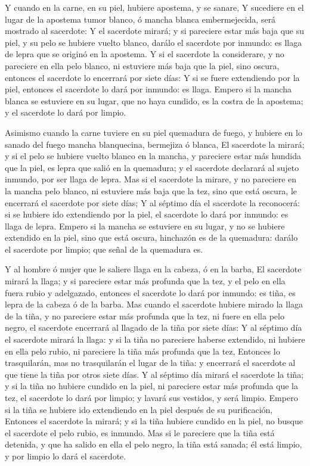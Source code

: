  Y cuando en la carne, en su piel, hubiere apostema, y se
sanare,  Y sucediere en el lugar de la apostema tumor
blanco, ó mancha blanca embermejecida, será mostrado al sacerdote:
 Y el sacerdote mirará; y si pareciere estar más baja que
su piel, y su pelo se hubiere vuelto blanco, darálo el sacerdote por
inmundo: es llaga de lepra que se originó en la apostema. 
Y si el sacerdote la considerare, y no pareciere en ella pelo blanco, ni
estuviere más baja que la piel, sino oscura, entonces el sacerdote lo
encerrará por siete días:  Y si se fuere extendiendo por la
piel, entonces el sacerdote lo dará por inmundo: es llaga. 
Empero si la mancha blanca se estuviere en su lugar, que no haya
cundido, es la costra de la apostema; y el sacerdote lo dará por limpio.

 Asimismo cuando la carne tuviere en su piel quemadura de
fuego, y hubiere en lo sanado del fuego mancha blanquecina, bermejiza ó
blanca,  El sacerdote la mirará; y si el pelo se hubiere
vuelto blanco en la mancha, y pareciere estar más hundida que la piel,
es lepra que salió en la quemadura; y el sacerdote declarará al sujeto
inmundo, por ser llaga de lepra.  Mas si el sacerdote la
mirare, y no pareciere en la mancha pelo blanco, ni estuviere más baja
que la tez, sino que está oscura, le encerrará el sacerdote por siete
días;  Y al séptimo día el sacerdote la reconocerá: si se
hubiere ido extendiendo por la piel, el sacerdote lo dará por inmundo:
es llaga de lepra.  Empero si la mancha se estuviere en su
lugar, y no se hubiere extendido en la piel, sino que está oscura,
hinchazón es de la quemadura: darálo el sacerdote por limpio; que señal
de la quemadura es.

 Y al hombre ó mujer que le saliere llaga en la cabeza, ó
en la barba,  El sacerdote mirará la llaga; y si pareciere
estar más profunda que la tez, y el pelo en ella fuera rubio y
adelgazado, entonces el sacerdote lo dará por inmundo: es tiña, es lepra
de la cabeza ó de la barba.  Mas cuando el sacerdote
hubiere mirado la llaga de la tiña, y no pareciere estar más profunda
que la tez, ni fuere en ella pelo negro, el sacerdote encerrará al
llagado de la tiña por siete días:  Y al séptimo día el
sacerdote mirará la llaga: y si la tiña no pareciere haberse extendido,
ni hubiere en ella pelo rubio, ni pareciere la tiña más profunda que la
tez,  Entonces lo trasquilarán, mas no trasquilarán el
lugar de la tiña: y encerrará el sacerdote al que tiene la tiña por
otros siete días.  Y al séptimo día mirará el sacerdote la
tiña; y si la tiña no hubiere cundido en la piel, ni pareciere estar más
profunda que la tez, el sacerdote lo dará por limpio; y lavará sus
vestidos, y será limpio.  Empero si la tiña se hubiere ido
extendiendo en la piel después de su purificación, 
Entonces el sacerdote la mirará; y si la tiña hubiere cundido en la
piel, no busque el sacerdote el pelo rubio, es inmundo. 
Mas si le pareciere que la tiña está detenida, y que ha salido en ella
el pelo negro, la tiña está sanada; él está limpio, y por limpio lo dará
el sacerdote.

